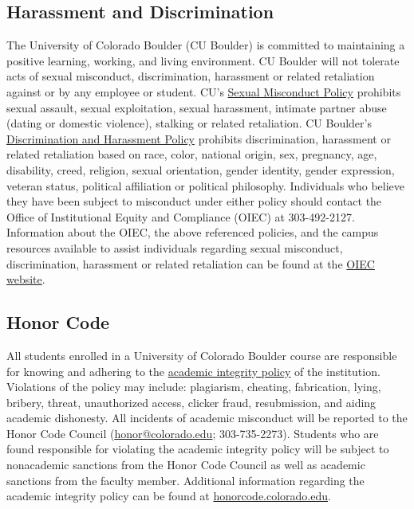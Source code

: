 \documentclass[11pt]{memoir}
\begin{document}
\subsection{Harassment and Discrimination}
The University of Colorado Boulder (CU Boulder) is committed to maintaining a positive learning, working, and living environment. CU Boulder will not tolerate acts of sexual misconduct, discrimination, harassment or related retaliation against or by any employee or student. CU's \href{http://www.colorado.edu/policies/discrimination-and-harassment-policy-and-procedures}{Sexual Misconduct Policy} prohibits sexual assault, sexual exploitation, sexual harassment, intimate partner abuse (dating or domestic violence), stalking or related retaliation. CU Boulder's \href{http://www.colorado.edu/policies/discrimination-and-harassment-policy-and-procedures}{Discrimination and Harassment Policy} prohibits discrimination, harassment or related retaliation based on race, color, national origin, sex, pregnancy, age, disability, creed, religion, sexual orientation, gender identity, gender expression, veteran status, political affiliation or political philosophy. Individuals who believe they have been subject to misconduct under either policy should contact the Office of Institutional Equity and Compliance (OIEC) at 303-492-2127. Information about the OIEC, the above referenced policies, and the campus resources available to assist individuals regarding sexual misconduct, discrimination, harassment or related retaliation can be found at the \href{http://www.colorado.edu/institutionalequity/}{OIEC website}.

\subsection{Honor Code}
All students enrolled in a University of Colorado Boulder course are responsible for knowing and adhering to the \href{http://www.colorado.edu/policies/academic-integrity-policy}{academic integrity policy} of the institution. Violations of the policy may include: plagiarism, cheating, fabrication, lying, bribery, threat, unauthorized access, clicker fraud, resubmission, and aiding academic dishonesty. All incidents of academic misconduct will be reported to the Honor Code Council (\href{mailto:honor@colorado.edu}{honor@colorado.edu}; 303-735-2273). Students who are found responsible for violating the academic integrity policy will be subject to nonacademic sanctions from the Honor Code Council as well as academic sanctions from the faculty member. Additional information regarding the academic integrity policy can be found at \href{http://honorcode.colorado.edu}{honorcode.colorado.edu}. 
\end{document}
